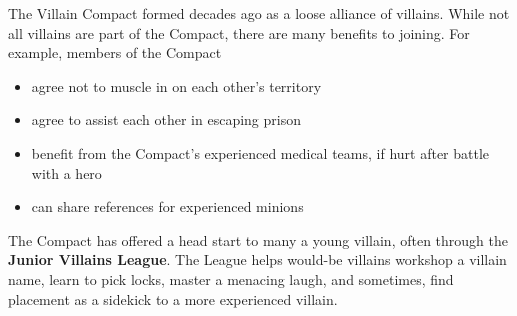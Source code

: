 \documentclass[blue]{LRSguildcamp1}
\begin{document}
\name{\bVillainCompact{}}

The Villain Compact formed decades ago as a loose alliance of villains.  While not all villains are part of the Compact, there are many benefits to joining.  For example, members of the Compact

\begin{itemize}
\item agree not to muscle in on each other's territory
\item agree to assist each other in escaping prison
\item benefit from the Compact's experienced medical teams, if hurt after battle with a hero
\item can share references for experienced minions
\end{itemize}

The Compact has offered a head start to many a young villain, often through the \textbf{Junior Villains League}.  The League helps would-be villains workshop a villain name, learn to pick locks, master a menacing laugh, and sometimes, find placement as a sidekick to a more experienced villain.
\end{document}

